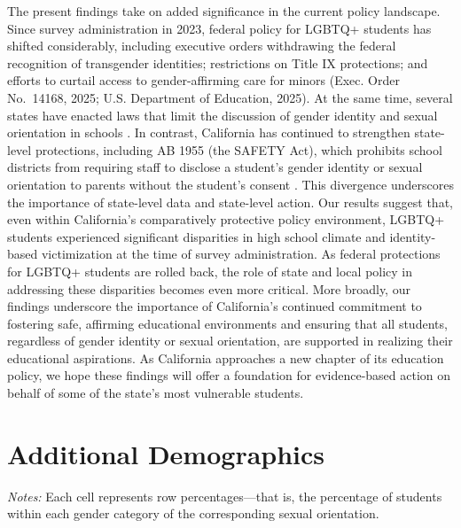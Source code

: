 The present findings take on added significance in the current policy
landscape. Since survey administration in 2023, federal policy for
LGBTQ+ students has shifted considerably, including executive orders
withdrawing the federal recognition of transgender identities;
restrictions on Title IX protections; and efforts to curtail access to
gender-affirming care for minors (Exec. Order No.~14168, 2025; U.S.
Department of Education, 2025). At the same time, several states have
enacted laws that limit the discussion of gender identity and sexual
orientation in schools \citep{movementadvancementproject2025a}. In
contrast, California has continued to strengthen state-level
protections, including AB 1955 (the SAFETY Act), which prohibits school
districts from requiring staff to disclose a student's gender identity
or sexual orientation to parents without the student's consent
\citep{information2023a, california2025a}.
This divergence underscores the importance of state-level data and
state-level action. Our results suggest that, even within California's
comparatively protective policy environment, LGBTQ+ students experienced
significant disparities in high school climate and identity-based
victimization at the time of survey administration. As federal
protections for LGBTQ+ students are rolled back, the role of state and
local policy in addressing these disparities becomes even more critical.
More broadly, our findings underscore the importance of California's
continued commitment to fostering safe, affirming educational
environments and ensuring that all students, regardless of gender
identity or sexual orientation, are supported in realizing their
educational aspirations. As California approaches a new chapter of its
education policy, we hope these findings will offer a foundation for
evidence-based action on behalf of some of the state's most vulnerable
students.



\appendix


\section{Additional Demographics}\label{appendix-a-additional-demographics}
\begin{table}
\centering
\caption{Gender Identity and Sexual Orientation Crosstab}
\label{tab:gender_so_crosstab}
\footnotesize
\setlength{\tabcolsep}{-1pt}

\medskip
\begin{minipage}{\linewidth}
\noindent\footnotesize\textit{Notes:} Each cell represents row percentages---that is, the percentage
of students within each gender category of the corresponding sexual
orientation.
\end{minipage}
\end{table}

